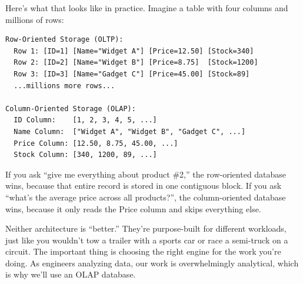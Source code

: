 \documentclass[
  letterpaper,
  DIV=11,
  numbers=noendperiod]{scrreprt}
\begin{document}
Here's what that looks like in practice. Imagine a table with four
columns and millions of rows:

\begin{verbatim}
Row-Oriented Storage (OLTP):
  Row 1: [ID=1] [Name="Widget A"] [Price=12.50] [Stock=340]
  Row 2: [ID=2] [Name="Widget B"] [Price=8.75]  [Stock=1200]
  Row 3: [ID=3] [Name="Gadget C"] [Price=45.00] [Stock=89]
  ...millions more rows...

Column-Oriented Storage (OLAP):
  ID Column:    [1, 2, 3, 4, 5, ...]
  Name Column:  ["Widget A", "Widget B", "Gadget C", ...]
  Price Column: [12.50, 8.75, 45.00, ...]
  Stock Column: [340, 1200, 89, ...]
\end{verbatim}

If you ask ``give me everything about product \#2,'' the row-oriented
database wins, because that entire record is stored in one contiguous
block. If you ask ``what's the average price across all products?'', the
column-oriented database wins, because it only reads the Price column
and skips everything else.

Neither architecture is ``better.'' They're purpose-built for different
workloads, just like you wouldn't tow a trailer with a sports car or
race a semi-truck on a circuit. The important thing is choosing the
right engine for the work you're doing. As engineers analyzing data, our
work is overwhelmingly analytical, which is why we'll use an OLAP
database.
\end{document}

